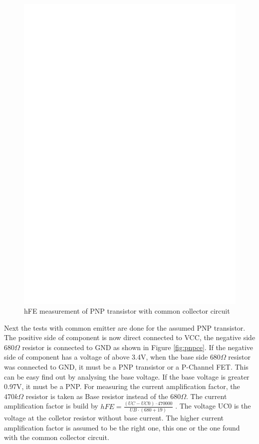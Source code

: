 \begin{figure}[H]
\centering
\includegraphics[]{../FIG/PNPcc.eps}
\caption{hFE measurement of PNP transistor with common collector circuit }
\label{fig:pnpcc}
\end{figure}

Next the tests with common emitter are done for the assumed PNP transistor.
The positive side of component is now direct connected to VCC, the negative side \(680\Omega\) resistor
is connected to GND as shown in Figure \ref{fig:pnpce}. 
If the negative side of component has a voltage of above 3.4V, when the base side \(680\Omega\) resistor 
was connected to GND, it must be a PNP transistor or a P-Channel FET.
This can be easy find out by analysing the base voltage. If the base voltage is greater 0.97V, it must be a PNP.
For measuring the current amplification factor, the \(470k\Omega\) resistor is taken as Base resistor
instead of the \(680\Omega\).
The current amplification factor is build by \(hFE = \frac{(UC-UC0) \cdot 470000}{UB \cdot (680+19)}\) .
The voltage UC0 is the voltage at the colletor resistor without base current.
The higher current amplification factor is assumed to be the right one, this one or the one found with
the common collector circuit.


